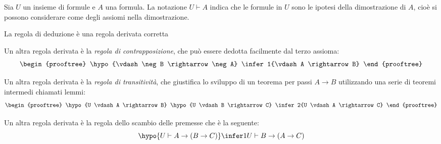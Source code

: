 \begin{defi}
Sia $U$ un insieme di formule e $A$ una formula.
La notazione $U \vdash A$ indica che le formule in $U$ sono le ipotesi della dimostrazione di $A$,
cioè si possono considerare come degli assiomi nella dimostrazione.
\end{defi}

\begin{thm}
La regola di deduzione è una regola derivata corretta
\end{thm}


Un altra regola derivata è la \emph{regola di contrapposizione}, che può essere
dedotta facilmente dal terzo assioma:
\begin{equation*}
\begin{prooftree}
\hypo{\vdash \neg B \rightarrow \neg A}
\infer1{\vdash A \rightarrow B}
\end{prooftree}
\end{equation*}


Un altra regola derivata è la \emph{regola di transitività}, che giustifica lo sviluppo
di un teorema per passi $A \rightarrow B$ utilizzando una serie di teoremi intermedi chiamati lemmi:
\begin{equation*}
\begin{prooftree}
\hypo{U \vdash A \rightarrow B}
\hypo{U \vdash B \rightarrow C}
\infer2{U \vdash A \rightarrow C}
\end{prooftree}
\end{equation*}

Un altra regola derivata è la regola dello scambio delle premesse che è la seguente:
\begin{equation*}
\hypo{U \vdash A \rightarrow (B \rightarrow C)}
\infer1{U \vdash B \rightarrow (A \rightarrow C)}
\end{equation*}
